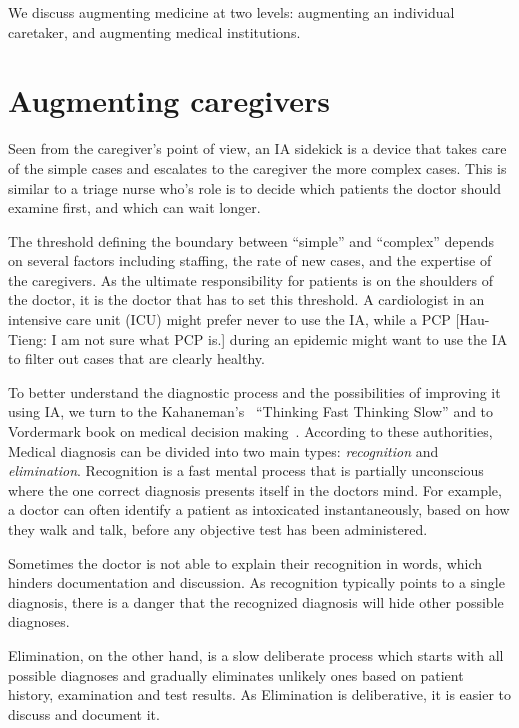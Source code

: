 \documentclass[11pt]{pnas-new}
\begin{document}
We discuss augmenting medicine at two levels: augmenting an
individual caretaker, and augmenting medical institutions.

\section{Augmenting caregivers}



Seen from the caregiver's point of view, an IA sidekick is a device
that takes care of the simple cases and escalates to the caregiver
the more complex cases. This is similar to a triage nurse who's role
is to decide which patients the doctor should examine first, and which
can wait longer.

The threshold defining the boundary between ``simple'' and ``complex''
depends on several factors including staffing, the rate of new cases, 
and the expertise of the caregivers. As the ultimate responsibility
for patients is on the shoulders of the doctor, it is the doctor that
has to set this threshold. A cardiologist in an intensive care unit (ICU) might prefer never
to use the IA, while a PCP {\color{red}[Hau-Tieng: I am not sure what PCP is.]} during an epidemic might want to use the IA
to filter out cases that are clearly healthy.

To better understand the diagnostic process and the possibilities  of
improving it using IA, we turn to the Kahaneman's~\cite{kahneman2011thinking}
``Thinking Fast Thinking Slow'' and to Vordermark book on medical
decision making~\cite{vordermark2019introduction}. According to these authorities,
Medical diagnosis can be divided into two main types: {\em
  recognition} and {\em elimination}. Recognition is a fast mental
process that is partially unconscious where the one correct diagnosis
presents itself in the doctors mind. For example, a doctor can often
identify a patient as intoxicated instantaneously, based on how they
walk and talk, before any objective test has been administered.

Sometimes the doctor is not able to explain their recognition in
words, which hinders documentation and discussion. As recognition
typically points to a single diagnosis, there is a danger that the
recognized diagnosis will hide other possible diagnoses.

Elimination, on the other hand, is a slow deliberate process which
starts with all possible diagnoses and gradually eliminates unlikely
ones based on patient history, examination and test results. As
Elimination is deliberative, it is easier to discuss and document it.
\end{document}
